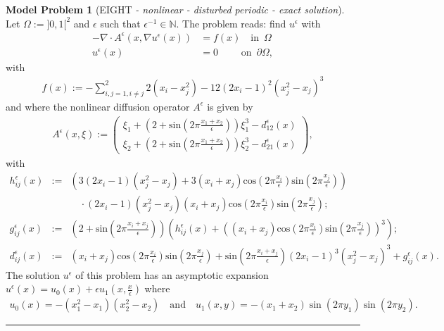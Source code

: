 \documentclass[a4paper,11pt]{article}
\theoremstyle{definition}
\newtheorem{modelproblem}{Model Problem} %
\begin{document}
\begin{modelproblem}[EIGHT {\it- nonlinear - disturbed periodic - exact solution}]
Let $\Omega := ]0,1[^2$ and $\epsilon$ such that $\epsilon^{-1} \in \mathbb{N}$.  The problem reads: find $u^{\epsilon}$ with
\begin{align*}
- \nabla \cdot A^{\epsilon}(x,\nabla u^{\epsilon}(x)) &= f(x) \quad \mbox{in} \enspace \Omega \\
u^{\epsilon}(x) &= 0 \hspace{28pt} \mbox{on} \enspace \partial \Omega,
\end{align*}
with
\begin{eqnarray*}
 f(x) := - \sum_{i,j=1,i\neq j}^2  2(x_i - x_j^2 ) - 12 (2 x_i - 1)^2(x_j^2 - x_j)^3
\end{eqnarray*}
and where the nonlinear diffusion operator  $A^{\epsilon}$ is given by
\begin{eqnarray*}
A^{\epsilon}(x,\xi) := \left( \begin{array}{c}
                                 \xi_1 + (2 + \mbox{sin}(2 \pi \frac{x_1 + x_2}{\epsilon} )) \xi_1^3 - d^{\epsilon}_{12}(x) \\
                                 \xi_2 + (2 + \mbox{sin}(2 \pi \frac{x_1 + x_2}{\epsilon} )) \xi_2^3 - d^{\epsilon}_{21}(x)
                               \end{array}\right),
\end{eqnarray*}
with
\begin{eqnarray*}
h_{ij}^{\epsilon}(x) &:=& \left( 3 ( 2 x_i - 1) (x_j^2 - x_j )
                   + 3 ( x_i + x_j ) \mbox{cos}( 2 \pi \frac{x_i}{\epsilon} ) \mbox{sin}( 2 \pi \frac{x_j}{\epsilon} ) \right)\\
&\enspace& \quad \cdot
 ( 2 x_i - 1) (x_j^2 - x_j ) ( x_i + x_j ) \mbox{cos}( 2 \pi \frac{x_i}{\epsilon} ) \mbox{sin}( 2 \pi \frac{x_j}{\epsilon} ); \\
g_{ij}^{\epsilon}(x) &:=& (2 + \mbox{sin}( 2 \pi \frac{x_i + x_j}{\epsilon} ) ) \left( h_{ij}^{\epsilon}(x) + \left( ( x_i + x_j ) \mbox{cos}( 2 \pi \frac{x_i}{\epsilon} ) \mbox{sin}( 2 \pi \frac{x_j}{\epsilon} ) \right)^3 \right); \\
 d^{\epsilon}_{ij}(x) &:=& ( x_i + x_j ) \mbox{cos}( 2 \pi \frac{x_i}{\epsilon} ) \mbox{sin}( 2 \pi \frac{x_j}{\epsilon} ) + \mbox{sin}( 2 \pi \frac{x_i + x_j}{\epsilon} ) (2 x_i - 1 )^3 ( x_j^2 - x_j )^3 + g_{ij}^{\epsilon}(x).
\end{eqnarray*}
The solution $u^{\epsilon}$ of this problem has an asymptotic expansion $u^{\epsilon}(x) = u_0(x) + \epsilon u_1(x,\frac{x}{\epsilon})$ where
\begin{eqnarray*}
 u_0(x) = - (x_1^2 - x_1)(x_2^2 - x_2) \quad \mbox{and} \quad u_1(x,y) = - (x_1 + x_2) \sin(2 \pi y_1) \sin(2 \pi y_2).
\end{eqnarray*}

\end{modelproblem}
\hrule
\end{document}

